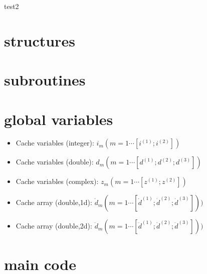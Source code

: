 \documentclass[a4paper,fleqn]{ltjsarticle}
\begin{document}
{\Large test2}
\section{structures}
\section{subroutines}
\section{global variables}
\begin{itemize}
\item Cache variables (integer): \(i_m (m = 1 \cdots [i^{(1)}; i^{(2)}])\)
\item Cache variables (double): \(d_m (m = 1 \cdots [d^{(1)}; d^{(2)}; d^{(3)}])\)
\item Cache variables (complex): \(z_m (m = 1 \cdots [z^{(1)}; z^{(2)}])\)
\item Cache array (double,1d): \(\dot{d}_m (m = 1 \cdots [\dot{d}^{(1)}; \dot{d}^{(2)}; \dot{d}^{(3)}]))\)
\item Cache array (double,2d): \(\ddot{d}_m (m = 1 \cdots [\ddot{d}^{(1)}; \ddot{d}^{(2)}; \ddot{d}^{(3)}]))\)
\end{itemize}
\section{main code}
\end{document}
